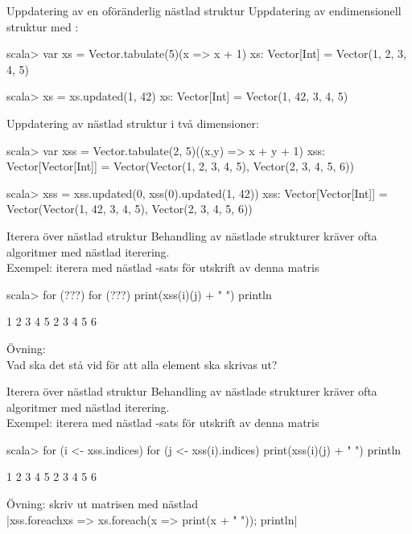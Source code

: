 \begin{Slide}{Uppdatering av en oföränderlig nästlad struktur}\SlideFontSmall
Uppdatering av endimensionell struktur med :\\
{\SlideFontTiny{} }
\begin{REPL}
scala> var xs = Vector.tabulate(5)(x => x + 1)
xs: Vector[Int] = Vector(1, 2, 3, 4, 5)

scala> xs = xs.updated(1, 42)
xs: Vector[Int] = Vector(1, 42, 3, 4, 5)
\end{REPL}

Uppdatering av nästlad struktur i två dimensioner:
\begin{REPL}
scala> var xss = Vector.tabulate(2, 5)((x,y) => x + y + 1)
xss: Vector[Vector[Int]] =
  Vector(Vector(1, 2, 3, 4, 5), Vector(2, 3, 4, 5, 6))

scala> xss = xss.updated(0, xss(0).updated(1, 42))
xss:
  Vector[Vector[Int]] =
  Vector(Vector(1, 42, 3, 4, 5), Vector(2, 3, 4, 5, 6))
\end{REPL}

\end{Slide}


\begin{Slide}{Iterera över nästlad struktur}\SlideFontSmall
Behandling av nästlade strukturer kräver ofta algoritmer med nästlad iterering. \\
Exempel: iterera med nästlad -sats för utskrift av denna matris\\
\pause
\begin{REPL}
scala> for (???) {
         for (???) {
           print(xss(i)(j) + " ")
         }
         println
       }

1 2 3 4 5
2 3 4 5 6
\end{REPL}
Övning: \\Vad ska det stå vid  för att alla element ska skrivas ut?
\end{Slide}

\begin{Slide}{Iterera över nästlad struktur}\SlideFontSmall
  \vspace{1em}
  Behandling av nästlade strukturer kräver ofta algoritmer med nästlad iterering. \\
  Exempel: iterera med nästlad -sats för utskrift av denna matris \\

  \begin{REPL}
scala> for (i <- xss.indices) {
         for (j <- xss(i).indices) {
           print(xss(i)(j) + " ")
         }
         println
       }

1 2 3 4 5
2 3 4 5 6
\end{REPL}
Övning: skriv ut matrisen med nästlad \\
\pause
\code|xss.foreach{xs => xs.foreach(x => print(x + " ")); println}|
\end{Slide}


